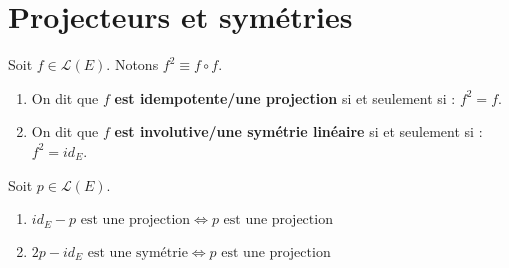 \section{Projecteurs et symétries}
\begin{definition}
    Soit $f \in \mathcal{L}(E)$. Notons $f^2 \equiv f \circ f$.
    \begin{enumerate}
        \item On dit que $f$ \textbf{est idempotente/une projection} si et seulement si : $f^2 = f$.
        \item On dit que $f$ \textbf{est involutive/une symétrie linéaire} si et seulement si : $f^2 = id_E$.
    \end{enumerate}
\end{definition}

\begin{proposition} 
    Soit $p \in \mathcal{L}(E)$.
    \begin{enumerate}
        \item $id_E - p \text{ est une projection} \iff p \text{ est une projection}$
        \item $2p - id_E \text{ est une symétrie} \iff p \text{ est une projection}$
    \end{enumerate}
\end{proposition}

